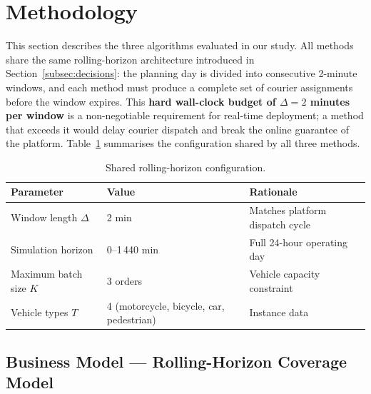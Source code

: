 
\section{Methodology}\label{sec:methodology}

This section describes the three algorithms evaluated in our study.
All methods share the same rolling-horizon architecture introduced in
Section~\ref{subsec:decisions}: the planning day is divided into
consecutive 2-minute windows, and each method must produce
a complete set of courier assignments before the window expires.
This \textbf{hard wall-clock budget of $\Delta = 2$ minutes per window}
is a non-negotiable requirement for real-time deployment; a method
that exceeds it would delay courier dispatch and break the online
guarantee of the platform.
Table~\ref{tab:method_params} summarises the configuration shared
by all three methods.

\begin{table}[ht]
\centering
\caption{Shared rolling-horizon configuration.}
\label{tab:method_params}
\small
\begin{tabular}{lll}
\toprule
\textbf{Parameter} & \textbf{Value} & \textbf{Rationale} \\
\midrule
Window length $\Delta$       & 2 min   & Matches platform dispatch cycle \\
Simulation horizon           & 0–1\,440 min & Full 24-hour operating day \\
Maximum batch size $K$       & 3 orders & Vehicle capacity constraint \\
Vehicle types $T$            & 4 (motorcycle, bicycle, car, pedestrian) & Instance data \\
\bottomrule
\end{tabular}
\end{table}

\subsection{Business Model — Rolling-Horizon Coverage Model}
\label{subsec:maxcover}

